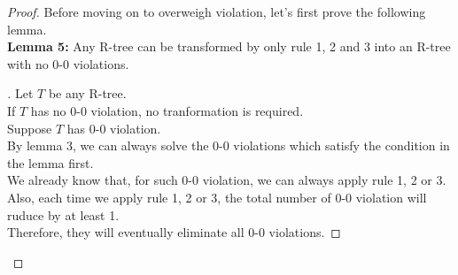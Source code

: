 \documentclass[10pt]{article}
\newenvironment{subproof}[1][\proofname]{%
	\renewcommand{\qedsymbol}{$\blacksquare$}%
	\begin{proof}[#1]%
}{%
	\end{proof}%
}
\begin{document}
\begin{enumerate}
\begin{proof}
	Before moving on to overweigh violation, let's first prove the following
	lemma.\\
	\textbf{Lemma 5:} Any R-tree can be transformed by only rule 1, 2 and 3
	into an R-tree with no 0-0 violations. 

	\begin{subproof}
		Let $T$ be any R-tree. \\
		If $T$ has no 0-0 violation, no tranformation is required. \\
		Suppose $T$ has 0-0 violation. \\
		By lemma 3, we can always solve the 0-0 violations which satisfy the
		condition in the lemma first. \\
		We already know that, for such 0-0 violation, we can always apply rule
		1, 2 or 3. \\
		Also, each time we apply rule 1, 2 or 3, the total number of 0-0 violation
		will ruduce by at least 1. \\
		Therefore, they will eventually eliminate all 0-0 violations. 
	\end{subproof}


\end{proof}
\end{enumerate}
\end{document}
